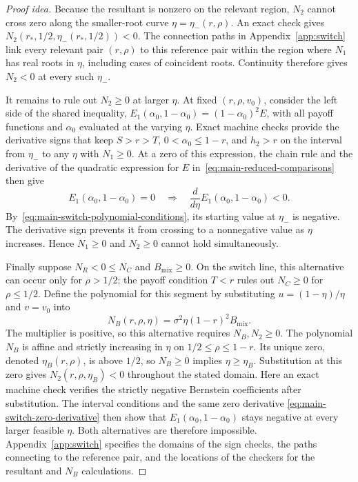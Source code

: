 \documentclass[11pt]{article}
\theoremstyle{remark}
\theoremstyle{plain}
\begin{document}
\begin{proof}[Proof idea]
Because the resultant is nonzero on the relevant region, $N_2$
cannot cross zero along the smaller-root curve $\eta=\eta_-(r,\rho)$.
An exact check gives
$N_2(r_*,1/2,\eta_-(r_*,1/2))<0$.
The connection paths in Appendix~\ref{app:switch} link every
relevant pair $(r,\rho)$ to this reference pair within the region
where $N_1$ has real roots in $\eta$, including cases of coincident
roots. Continuity therefore gives $N_2<0$ at every such $\eta_-$.

It remains to rule out $N_2\ge0$ at larger $\eta$.
At fixed $(r,\rho,v_0)$, consider the left side of the shared
inequality,
$E_1(\alpha_0,1-\alpha_0)=(1-\alpha_0)^2E$, with all payoff functions and $\alpha_0$
evaluated at the varying $\eta$.
Exact machine checks provide the derivative signs that keep
$S>r>T$, $0<\alpha_0\le1-r$, and $h_2>r$ on the interval from
$\eta_-$ to any $\eta$ with $N_1\ge0$. At a zero of this
expression, the chain rule and the derivative of the quadratic
expression for $E$ in~\eqref{eq:main-reduced-comparisons} then give
\begin{equation}
 E_1(\alpha_0,1-\alpha_0)=0\quad\Longrightarrow\quad
 \frac{d}{d\eta}E_1(\alpha_0,1-\alpha_0)<0.
 \label{eq:main-switch-zero-derivative}
\end{equation}
By~\eqref{eq:main-switch-polynomial-conditions}, its starting value
at $\eta_-$ is negative. The derivative sign prevents it from
crossing to a nonnegative value as $\eta$ increases.
Hence $N_1\ge0$ and $N_2\ge0$ cannot hold simultaneously.

Finally suppose $N_R<0\le N_C$ and $B_{\mathrm{mix}}\ge0$.
On the switch line, this alternative can occur only for $\rho>1/2$;
the payoff condition $T<r$ rules out $N_C\ge0$ for $\rho\le1/2$.
Define the polynomial for this segment by substituting
$u=(1-\eta)/\eta$ and $v=v_0$ into
\begin{equation}
 N_B(r,\rho,\eta)=\sigma^2\eta(1-r)^2B_{\mathrm{mix}}.
 \label{eq:main-second-switch-numerator}
\end{equation}
The multiplier is positive, so this alternative requires
$N_B,N_2\ge0$. The polynomial $N_B$ is affine and strictly
increasing in $\eta$ on $1/2\le\rho\le1-r$.
Its unique zero, denoted $\eta_B(r,\rho)$, is above $1/2$, so
$N_B\ge0$ implies $\eta\ge\eta_B$.
Substitution at this zero gives $N_2(r,\rho,\eta_B)<0$ throughout
the stated domain. Here an exact machine check verifies the
strictly negative Bernstein coefficients after substitution.
The interval conditions and the same zero derivative
\eqref{eq:main-switch-zero-derivative} then show that $E_1(\alpha_0,1-\alpha_0)$
stays negative at every larger feasible $\eta$.
Both alternatives are therefore impossible.
Appendix~\ref{app:switch} specifies the domains of the sign checks,
the paths connecting to the reference pair, and the locations of the
checkers for the resultant and $N_B$ calculations.
\end{proof}
\end{document}
